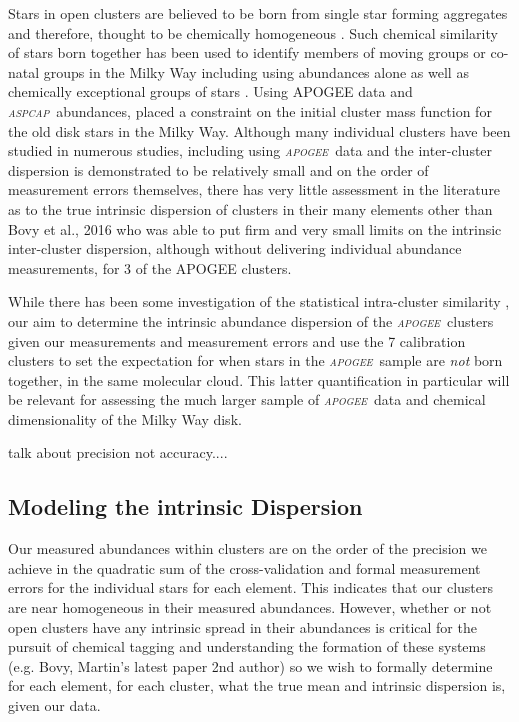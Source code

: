 \documentclass[14pt, preprint2]{aastex6}
\newcommand{\project}[1]{\textsl{#1}}
\newcommand{\apogee}{\project{\textsc{apogee}}}
\newcommand{\aspcap}{\project{\textsc{aspcap}}}
\begin{document}
Stars in open clusters are believed to be born from single star forming aggregates and therefore, thought to be chemically homogeneous \citep[e.g.][]{deSilva2007,deSilva2009}. Such chemical similarity of stars born together has been used to identify members of moving groups or co-natal groups in the Milky Way including using abundances alone \citep[e.g.][]{Majewski2012a, Hogg2016} as well as chemically exceptional groups of stars \citep[e.g.][]{Schiavon2016, Martell2016}.  Using APOGEE data and \aspcap\ abundances, \citet{Ting2016} placed a constraint on the initial cluster mass function for the old disk stars in the Milky Way.  Although many individual clusters have been studied in numerous studies, including using \apogee\ data \citep[e.g.][]{Souto2016, Cuhna2015, F2013} and the inter-cluster dispersion is demonstrated to be relatively small and on the order of measurement errors themselves, there has very little assessment in the literature as to the true intrinsic dispersion of clusters in their many elements other than Bovy et al., 2016 who was able to put firm and very small limits on the intrinsic inter-cluster dispersion, although without delivering individual abundance measurements, for 3 of the APOGEE clusters. 

While there has been some investigation of the statistical intra-cluster similarity \citep[][]{M2014, deSilva2015}, our aim to determine the intrinsic abundance dispersion of the \apogee\ clusters given our measurements and measurement errors and use the 7 calibration clusters to set the expectation for when stars in the \apogee\ sample are \textit{not} born together, in the same molecular cloud. This latter quantification in particular will be relevant for assessing the much larger sample of \apogee\ data and chemical dimensionality of the Milky Way disk. 

talk about precision not accuracy.... 

\subsection{Modeling the intrinsic Dispersion}

Our measured abundances within clusters are on the order of the precision we achieve in the quadratic sum of the cross-validation and formal measurement errors for the individual stars for each element. This indicates that our clusters are near homogeneous in their measured abundances. However, whether or not open clusters have any intrinsic spread in their abundances is critical for the pursuit of chemical tagging and understanding the formation of these systems (e.g. Bovy, Martin's latest paper 2nd author) so we wish to formally determine for each element, for each cluster, what the true mean and intrinsic dispersion is, given our data. 
\end{document}
